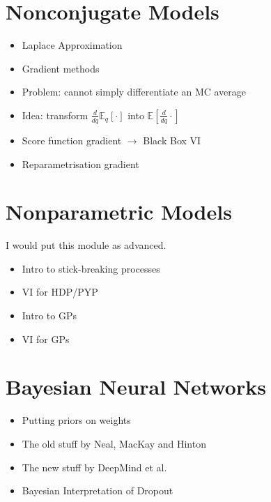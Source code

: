 \documentclass[11pt, a4paper]{article}
\begin{document}
\section{Nonconjugate Models}
\begin{itemize}
\item Laplace Approximation 
\item Gradient methods
\item Problem: cannot simply differentiate an MC average
\item Idea: transform $ \frac{d}{dq} \mathbb{E}_{q}[\cdot] $ into $ \mathbb{E}[\frac{d}{dq}\cdot] $
\item Score function gradient $ \rightarrow $ Black Box VI \citep{PaisleyEtAl:2012, RanganathEtAl:2014}
\item Reparametrisation gradient \citep{KingmaWelling:2013, RezendeEtAl:2014, TitsiasLazarogredilla:2014}
\end{itemize}

\section{Nonparametric Models}

I would put this module as advanced.

\begin{itemize}
\item Intro to stick-breaking processes \citep{IshwaranJames:2001}
\item VI for HDP/PYP \citep{WangEtAl:2011}
\item Intro to GPs
\item VI for GPs
\end{itemize}

\section{Bayesian Neural Networks}
\begin{itemize}
\item Putting priors on weights
\item The old stuff by Neal, MacKay and Hinton \citep{HintonVancamp:1993}
\item The new stuff by DeepMind et al. \citep{Graves:2011, BlundellEtAl:2015}
\item Bayesian Interpretation of Dropout \citep{Gal:2016}
\end{itemize}
\end{document}
